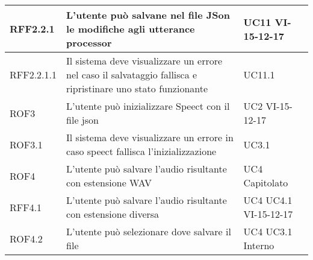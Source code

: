 \documentclass[../AnalisideiRequisiti.tex]{subfiles}
\begin{document}
\begin{longtable}{| p{3cm} | p{6cm} | p{3cm} |}
		\newline RFF2.2.1&
		\newline L'utente può salvane nel file JSon le modifiche agli utterance processor&
		\newline UC11 \newline VI-15-12-17
		\\[1em]	
		\hline
		
		\newline RFF2.2.1.1&
		\newline Il sistema deve visualizzare un errore nel caso il salvataggio fallisca e ripristinare uno stato funzionante&
		\newline UC11.1 
		\\[1em]	
		\hline

		\newline ROF3&
		\newline L'utente può inizializzare Speect con il file json&
		\newline UC2 \newline VI-15-12-17
		\\[1em]	
			\hline	
		
		\newline ROF3.1&
		\newline Il sistema deve visualizzare un errore in caso speect fallisca l'inizializzazione&
		\newline UC3.1
		\\[1em]		
		\hline
		
		\newline ROF4&
		\newline L'utente può salvare l'audio risultante con estensione WAV&
		\newline UC4 \newline Capitolato
		\\[1em]
			\hline
			
		\newline RFF4.1&
		\newline L'utente può salvare l'audio risultante con estensione diversa&
		\newline UC4 \newline UC4.1 \newline VI-15-12-17 
		\\[1em]
		\hline
		
		\newline ROF4.2&
		\newline L'utente può selezionare dove salvare il file&
		\newline UC4 \newline UC3.1 \newline Interno
		\\[1em]
		

\end{longtable}
\end{document}
